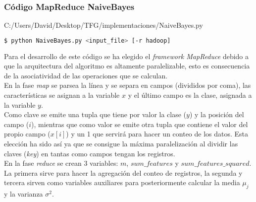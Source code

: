 \subsubsection*{Código MapReduce NaiveBayes}

                {C:/Users/David/Desktop/TFG/implementaciones/NaiveBayes.py}
                  
\begin{lstlisting}[language=bash, numbers=none]
$ python NaiveBayes.py <input_file> [-r hadoop]
\end{lstlisting}

Para el desarrollo de este código se ha elegido el \textit{framework MapReduce} debido a que la arquitectura del
algoritmo es altamente paralelizable, esto es consecuencia de la asociatividad de las operaciones que se calculan.\\
En la fase \textit{map} se parsea la línea y se separa en campos (divididos por coma), las características se 
asignan a la variable $x$ y el último campo es la clase, asignada a la variable $y$.\\
Como clave se emite una tupla que tiene por valor la clase ($y$) y la posición del campo ($i$), mientras que
como valor se emite otra tupla que contiene el valor del propio campo ($x[i]$) y un 1 que servirá para hacer
un conteo de los datos. Esta elección ha sido así ya que se consigue la máxima paralelización al dividir las 
claves (\textit{key}) en tantas como campos tengan los registros.\\
En la fase \textit{reduce} se crean 3 variables: $m$, $sum\_features$ y $sum\_features\_squared$. La primera sirve
para hacer la agregación del conteo de registros, la segunda y tercera sirven como variables auxiliares para 
posteriormente calcular la media $\mu_j$ y la varianza $\sigma^2$.
                    
\clearpage
